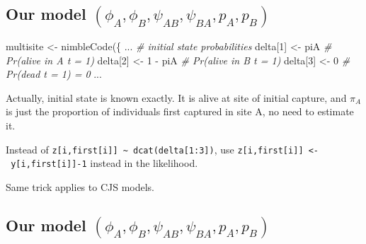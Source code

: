 \documentclass[
  12pt,
]{krantz}
\newenvironment{Shaded}{\begin{snugshade}}{\end{snugshade}}
\newcommand{\CommentTok}[1]{\textcolor[rgb]{0.56,0.35,0.01}{\textit{#1}}}
\newcommand{\DecValTok}[1]{\textcolor[rgb]{0.00,0.00,0.81}{#1}}
\newcommand{\FunctionTok}[1]{\textcolor[rgb]{0.00,0.00,0.00}{#1}}
\newcommand{\NormalTok}[1]{#1}
\newcommand{\OtherTok}[1]{\textcolor[rgb]{0.56,0.35,0.01}{#1}}
\newcommand{\SpecialCharTok}[1]{\textcolor[rgb]{0.00,0.00,0.00}{#1}}
\begin{document}
\hypertarget{our-model-phi_a-phi_b-psi_ab-psi_ba-p_a-p_b-2}{%
\subsection{\texorpdfstring{Our model \((\phi_A, \phi_B, \psi_{AB}, \psi_{BA}, p_A, p_B)\)}{Our model (\textbackslash phi\_A, \textbackslash phi\_B, \textbackslash psi\_\{AB\}, \textbackslash psi\_\{BA\}, p\_A, p\_B)}}\label{our-model-phi_a-phi_b-psi_ab-psi_ba-p_a-p_b-2}}

\begin{Shaded}
\begin{Highlighting}[]
\NormalTok{multisite }\OtherTok{\textless{}{-}} \FunctionTok{nimbleCode}\NormalTok{(\{}
\NormalTok{...}
  \CommentTok{\# initial state probabilities}
\NormalTok{  delta[}\DecValTok{1}\NormalTok{] }\OtherTok{\textless{}{-}}\NormalTok{ piA          }\CommentTok{\# Pr(alive in A t = 1)}
\NormalTok{  delta[}\DecValTok{2}\NormalTok{] }\OtherTok{\textless{}{-}} \DecValTok{1} \SpecialCharTok{{-}}\NormalTok{ piA      }\CommentTok{\# Pr(alive in B t = 1)}
\NormalTok{  delta[}\DecValTok{3}\NormalTok{] }\OtherTok{\textless{}{-}} \DecValTok{0}            \CommentTok{\# Pr(dead t = 1) = 0}
\NormalTok{...}
\end{Highlighting}
\end{Shaded}

Actually, initial state is known exactly. It is alive at site of initial capture, and \(\pi_A\) is just the proportion of individuals first captured in site A, no need to estimate it.

Instead of \texttt{z{[}i,first{[}i{]}{]}\ \textasciitilde{}\ dcat(delta{[}1:3{]})}, use \texttt{z{[}i,first{[}i{]}{]}\ \textless{}-\ y{[}i,first{[}i{]}{]}-1} instead in the likelihood.

Same trick applies to CJS models.

\hypertarget{our-model-phi_a-phi_b-psi_ab-psi_ba-p_a-p_b-3}{%
\subsection{\texorpdfstring{Our model \((\phi_A, \phi_B, \psi_{AB}, \psi_{BA}, p_A, p_B)\)}{Our model (\textbackslash phi\_A, \textbackslash phi\_B, \textbackslash psi\_\{AB\}, \textbackslash psi\_\{BA\}, p\_A, p\_B)}}\label{our-model-phi_a-phi_b-psi_ab-psi_ba-p_a-p_b-3}}
\end{document}
